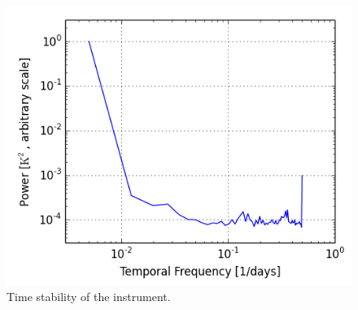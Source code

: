 \documentclass[twocolumn,numberedappendix]{emulateapj} \shorttitle{PSA64}
\begin{document}
\begin{figure}
\centering
\includegraphics[width=\columnwidth]{plots/stability.png}
\caption{Time stability of the instrument.}
\label{fig:stability}
\end{figure}






%
%
%
%
\end{document}
